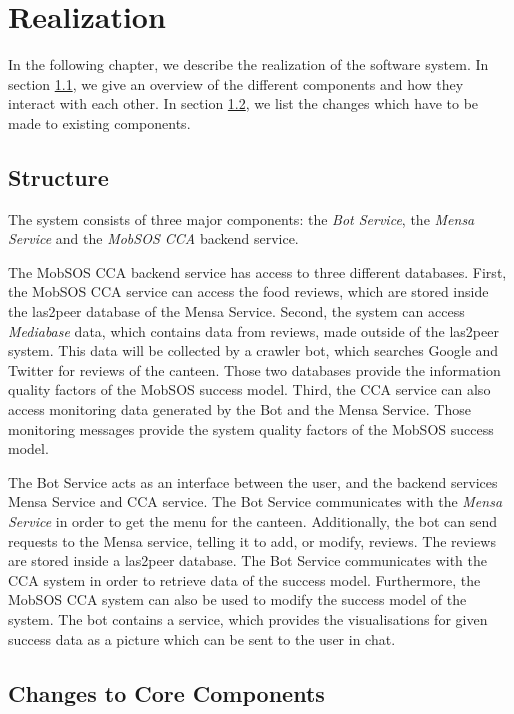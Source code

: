 \chapter{Realization}

In the following chapter, we describe the realization of the software system. In section \ref{sec:structure}, we give an overview of the different components and how they interact with each other. In section \ref{sec:changes}, we list the changes which have to be made to existing components.

\section{Structure}\label{sec:structure}

The system consists of three major components: the \emph{Bot Service}, the \emph{Mensa Service} and the \emph{MobSOS CCA} backend service.

The MobSOS CCA backend service has access to three different databases. First, the MobSOS CCA service can access the food reviews, which are stored inside the las2peer database of the Mensa Service. Second, the system can access \emph{Mediabase} data, which contains data from reviews, made outside of the las2peer system. This data will be collected by a crawler bot, which searches Google and Twitter for reviews of the canteen. Those two databases provide the information quality factors of the MobSOS success model.
Third, the CCA service can also access monitoring data generated by the Bot and the Mensa Service. Those monitoring messages provide the system quality factors of the MobSOS success model.

The Bot Service acts as an interface between the user, and the backend services Mensa Service and CCA service.
The Bot Service communicates with the \emph{Mensa Service} in order to get the menu for the canteen. Additionally, the bot can send requests to the Mensa service, telling it to add, or modify, reviews. The reviews are stored inside a las2peer database.
The Bot Service communicates with the CCA system in order to retrieve data of the success model. Furthermore, the MobSOS CCA system can also be used to modify the success model of the system. The bot contains a service, which provides the visualisations for given success data as a picture which can be sent to the user in chat.

\section{Changes to Core Components} \label{sec:changes}

